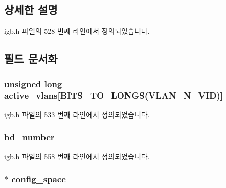 \subsection{상세한 설명}


igb.\+h 파일의 528 번째 라인에서 정의되었습니다.



\subsection{필드 문서화}
\subsubsection[{\texorpdfstring{active\+\_\+vlans}{active_vlans}}]{\setlength{\rightskip}{0pt plus 5cm}unsigned long active\+\_\+vlans\mbox{[}{\bf B\+I\+T\+S\+\_\+\+T\+O\+\_\+\+L\+O\+N\+GS}(V\+L\+A\+N\+\_\+\+N\+\_\+\+V\+ID)\mbox{]}}\hypertarget{structigb__adapter_acb1f06f1c2bb78264a0e21e01633e869}{}\label{structigb__adapter_acb1f06f1c2bb78264a0e21e01633e869}


igb.\+h 파일의 533 번째 라인에서 정의되었습니다.

\subsubsection[{\texorpdfstring{bd\+\_\+number}{bd_number}}]{ bd\+\_\+number}\hypertarget{structigb__adapter_a6cd9dc976314452b3fa56402f4e3273e}{}\label{structigb__adapter_a6cd9dc976314452b3fa56402f4e3273e}


igb.\+h 파일의 558 번째 라인에서 정의되었습니다.

\subsubsection[{\texorpdfstring{config\+\_\+space}{config_space}}]{$\ast$ config\+\_\+space}\hypertarget{structigb__adapter_a514833e31e1159a00fdd0626a47220aa}{}\label{structigb__adapter_a514833e31e1159a00fdd0626a47220aa}


